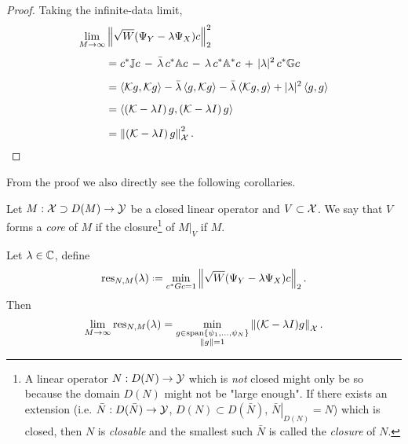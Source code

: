 \begin{proof}
    Taking the infinite-data limit,
    \begin{equation}
        \label{eq:residual}
        \begin{split}
            \lim_{M \to \infty} & \left\| \sqrt{W} ( \Psi_Y - \lambda \Psi_X ) c \right\|_2^2 \\[1ex]
            &= c^* \mathbb{J} c \,-\, \bar{\lambda} \,c^* \mathbb{A} c \,-\, \lambda\, c^* \mathbb{A}^* c \,+\, | \lambda |^2\, c^* \mathbb{G} c \\[1.2ex]
            &= \left\langle \mathcal{K} g, \mathcal{K} g \right\rangle
            - \bar{\lambda} \left\langle g, \mathcal{K} g \right\rangle
            - \bar{\lambda} \left\langle \mathcal{K} g, g \right\rangle
            + | \lambda |^2 \left\langle g, g \right\rangle \\[1.2ex]
            &= \left\langle \left( \mathcal{K} - \lambda I \right) g, 
            \left( \mathcal{K} - \lambda I \right) g \right\rangle \\[1.2ex]
            &= \left\| \left( \mathcal{K} - \lambda I \right) g \right\|_{\mathcal{X}}^2 . 
        \end{split}
    \end{equation}
\end{proof}

From the proof we also directly see the following corollaries. 

\begin{definition}
    Let $M : \mathcal{X} \supset D(M) \to \mathcal{Y}$ be a closed linear operator and 
    $V \subset \mathcal{X}$. We say that $V$ forms a \emph{core} of $M$ if the closure\footnote{
        A linear operator $N : D(N) \to \mathcal{Y}$ which is \emph{not} closed might only be so 
        because the domain $D(N)$ might not be "large enough". If there exists an extension 
        (i.e. $\bar{N} : D(\bar{N}) \to \mathcal{Y}$, $D(N) \subset D(\bar{N})$, 
        $\left. \bar{N} \right|_{D(N)} = N$) which is closed, then $N$ is \emph{closable} and 
        the smallest such $\bar{N}$ is called the \emph{closure} of $N$. 
    } 
    of $\left. M \right|_{V}$ if $M$. 
\end{definition}

\begin{corollary}
    Let $\lambda \in \mathbb{C}$, define
    \begin{equation}
        \res_{N,M} (\lambda)
        \defeq \min_{c^* G c = 1} \left\| \sqrt{W} ( \YY - \lambda \YX ) c \right\|_2 . 
    \end{equation} 
    Then
    \begin{equation}
        \label{eq:resdmd_M_limit}
        \lim_{M \to \infty} \text{res}_{N,M} (\lambda)
        = \min_{\substack{g \in \text{span} \left\{ \psi_1, \ldots, \psi_N \right\} \\ \| g \| = 1}}
            \left\| ( \mathcal{K} - \lambda I ) g \right\|_{\mathcal{X}} . 
    \end{equation}
\end{corollary}

